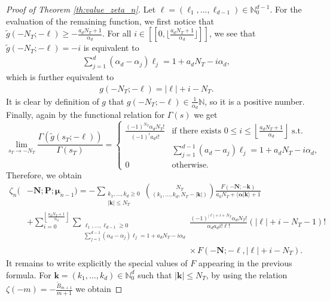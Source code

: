 \documentclass[10pt,a4paper]{amsart}
\begin{document}
\begin{proof}[Proof of Theorem \ref{th:value_zeta_n}]
Let $\boldsymbol{\ell}=(\ell_1,\ldots,\ell_{d-1}) \in \mathbb{N}_0^{d-1}$. For the evaluation of the remaining function, we first notice that $\widetilde{g}(-N_T;-\boldsymbol{\ell}) \geq -\frac{a_dN_T+1}{\alpha_d}$. For all $i \in [\![ 0,\lfloor \frac{a_dN_T+1}{\alpha_d} \rfloor ]\!]$, we see that
$\widetilde{g}(-N_T;-\boldsymbol{\ell})=-i$ is equivalent to
\begin{align*}
\sum_{j=1}^{d} (\alpha_d-\alpha_j) \ell_j=1+a_dN_T-i\alpha_d,
\end{align*}
which is further equivalent to
\begin{align*}
    g(-N_T;-\boldsymbol{\ell})=|\boldsymbol{\ell}|+i-N_T.
\end{align*}
It is clear by definition of $g$ that $g(-N_T;-\boldsymbol{\ell}) \in \frac{1}{\alpha_d}\mathbb{N}$, so it is a positive number. Finally, again by the functional relation for $\Gamma(s)$ we get
\[
    \lim_{s_T \to -N_T} \frac{\Gamma(\widetilde{g}(s_T;-\boldsymbol{\ell}))}{\Gamma(s_T)} =
    \begin{cases}
        \frac{(-1)^{N_T}\alpha_dN_T!}{(-1)^ia_di!} & \text{if there exists } 0 \leq i \leq \left\lfloor \frac{a_dN_T+1}{\alpha_d}\right\rfloor \text{ s.t.} \\
        & \sum_{j=1}^{d-1} (a_d-a_j) \ell_j=1+a_dN_T-i\alpha_d, \\
        0 &\text{otherwise.}
    \end{cases}
\]
Therefore, we obtain
\begin{align*}
    \zeta_{n}(&-\mathbf{N};\mathbf{P};\boldsymbol{\mu}_{n-1})=-\sum_{\substack{k_1,\ldots,k_d \geq 0 \\ |\mathbf{k}| \leq N_T}} \binom{N_T}{(k_1,\ldots,k_d,N_T-|\mathbf{k}|)} \frac{F(-\mathbf{N};-\mathbf{k})}{a_0N_T+\langle \boldsymbol{\alpha}|\mathbf{k}\rangle+1} \\
    &+ \sum_{i=0}^{\left\lfloor \frac{a_dN_T+1}{\alpha_d}\right\rfloor} \sum_{\substack{\ell_1,\ldots,\ell_{d-1} \geq 0 \\ \sum_{j=1}^{d-1} (\alpha_d-\alpha_j) \ell_j=1+a_dN_T-i\alpha_d}} \frac{(-1)^{|\boldsymbol{\ell}|+i+N_T}\alpha_dN_T!}{\alpha_da_di!\boldsymbol{\ell}!}(|\boldsymbol{\ell}|+i-N_T-1)! \\
    & \hspace{231pt} \times F(-\mathbf{N};-\boldsymbol{\ell},|\boldsymbol{\ell}|+i-N_T).
\end{align*}
It remains to write explicitly the special values of $F$ appearing in the previous formula. For $\mathbf{k}=(k_1,\ldots,k_d) \in \mathbb{N}_0^d$ such that $|\mathbf{k}|\leq N_T$, by using the relation $\zeta(-m)=-\frac{\widetilde{B}_{m+1}}{m+1}$ we obtain

\end{proof}
\end{document}
